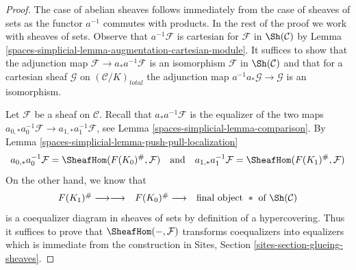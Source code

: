 \begin{proof}
The case of abelian sheaves follows immediately from the case
of sheaves of sets as the functor $a^{-1}$ commutes with products.
In the rest of the proof we work with sheaves of sets.
Observe that $a^{-1}\mathcal{F}$ is cartesian for
$\mathcal{F}$ in $\Sh(\mathcal{C})$ by
Lemma \ref{spaces-simplicial-lemma-augmentation-cartesian-module}.
It suffices to show that the adjunction map
$\mathcal{F} \to a_*a^{-1}\mathcal{F}$
is an isomorphism $\mathcal{F}$ in $\Sh(\mathcal{C})$
and that for a cartesian sheaf
$\mathcal{G}$ on $(\mathcal{C}/K)_{total}$
the adjunction map
$a^{-1}a_*\mathcal{G} \to \mathcal{G}$ is an isomorphism.

\medskip\noindent
Let $\mathcal{F}$ be a sheaf on $\mathcal{C}$.
Recall that $a_*a^{-1}\mathcal{F}$ is the equalizer
of the two maps $a_{0, *}a_0^{-1}\mathcal{F} \to a_{1, *}a_1^{-1}\mathcal{F}$,
see Lemma \ref{spaces-simplicial-lemma-comparison}.
By Lemma \ref{spaces-simplicial-lemma-push-pull-localization}
$$
a_{0, *}a_0^{-1}\mathcal{F} = \SheafHom(F(K_0)^\#, \mathcal{F})
\quad\text{and}\quad
a_{1, *}a_1^{-1}\mathcal{F} = \SheafHom(F(K_1)^\#, \mathcal{F})
$$
On the other hand, we know that
$$
\begin{array}{ccc}F(K_1)^\# \longrightarrow\longrightarrow & F(K_0)^\# \longrightarrow & \text{final object }*\text{ of }\Sh(\mathcal{C})\end{array}
$$
is a coequalizer diagram in sheaves of sets by definition of
a hypercovering. Thus it suffices to prove
that $\SheafHom(-, \mathcal{F})$ transforms coequalizers
into equalizers which is immediate from the construction
in Sites, Section \ref{sites-section-glueing-sheaves}.


\end{proof}
